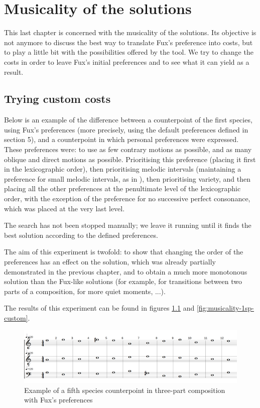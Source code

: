 \chapter{Musicality of the solutions}
This last chapter is concerned with the musicality of the solutions. Its objective is not anymore to discuss the best way to translate Fux's preference into costs, but to play a little bit with the possibilities offered by the tool. We try to change the costs in order to leave Fux's initial preferences and to see what it can yield as a result.

\section{Trying custom costs}
Below is an example of the difference between a counterpoint of the first species, using Fux's preferences (more precisely, using the default preferences defined in section 5), and a counterpoint in which personal preferences were expressed. These preferences were: to use as few contrary motions as possible, and as many oblique and direct motions as possible. Prioritising this preference (placing it first in the lexicographic order), then prioritising melodic intervals (maintaining a preference for small melodic intervals, as in \gap), then prioritising variety, and then placing all the other preferences at the penultimate level of the lexicographic order, with the exception of the preference for no successive perfect consonance, which was placed at the very last level.

The search has not been stopped manually; we leave it running until it finds the best solution according to the defined preferences.

The aim of this experiment is twofold: to show that changing the order of the preferences has an effect on the solution, which was already partially demonstrated in the previous chapter, and to obtain a much more monotonous solution than the Fux-like solutions (for example, for transitions between two parts of a composition, for more quiet moments, ...).

The results of this experiment can be found in figures \ref{fig:musicality-1sp-fux} and \ref{fig:musicality-1sp-custom}.
\begin{figure}[h]
    \centering
    \includegraphics[width=1\textwidth]{Images/Musicality/musicality-1sp-fux-pref.png}
    \caption{Example of a fifth species counterpoint in three-part composition with Fux's preferences}
    \label{fig:musicality-1sp-fux}
\end{figure}

